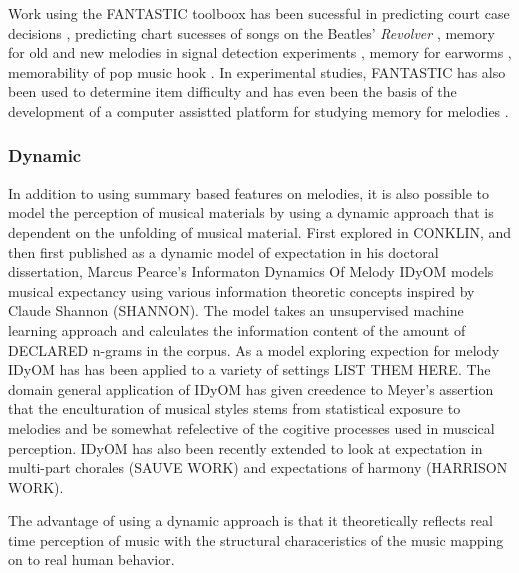 \documentclass[]{book}
\theoremstyle{definition}
\theoremstyle{definition}
\theoremstyle{definition}
\theoremstyle{remark}
\begin{document}
Work using the FANTASTIC toolboox has been sucessful in predicting court
case decisions \citep{mullensiefenCourtDecisionsMusic2009}, predicting
chart sucesses of songs on the Beatles' \emph{Revolver}
\citep{kopiezAufSucheNach2011}, memory for old and new melodies in
signal detection experiments
\citep{mullensiefenRoleFeaturesContext2014}, memory for earworms
\citep{jakubowskiDissectingEarwormMelodic2017, williamsonEarwormsThreeAngles2012},
memorability of pop music hook \citep{balenCorpusAnalyisTools2015}. In
experimental studies, FANTASTIC has also been used to determine item
difficulty
\citep{bakerPerceptionLeitmotivesRichard2017, harrisonModellingMelodicDiscrimination2016}
and has even been the basis of the development of a computer assistted
platform for studying memory for melodies
\citep{rainsfordMUSOSMUsicSOftware2018}.

\hypertarget{dynamic}{%
\subsubsection{Dynamic}\label{dynamic}}

In addition to using summary based features on melodies, it is also
possible to model the perception of musical materials by using a dynamic
approach that is dependent on the unfolding of musical material. First
explored in CONKLIN, and then first published as a dynamic model of
expectation in his doctoral dissertation, Marcus Pearce's Informaton
Dynamics Of Melody IDyOM models musical expectancy using various
information theoretic concepts inspired by Claude Shannon (SHANNON). The
model takes an unsupervised machine learning approach and calculates the
information content of the amount of DECLARED n-grams in the corpus. As
a model exploring expection for melody IDyOM has has been applied to a
variety of settings LIST THEM HERE. The domain general application of
IDyOM has given creedence to Meyer's assertion that the enculturation of
musical styles stems from statistical exposure to melodies and be
somewhat refelective of the cogitive processes used in muscical
perception. IDyOM has also been recently extended to look at expectation
in multi-part chorales (SAUVE WORK) and expectations of harmony
(HARRISON WORK).

\citep{pearceAuditoryExpectationInformation2012a, pearceStatisticalLearningProbabilistic2018}

The advantage of using a dynamic approach is that it theoretically
reflects real time perception of music with the structural
characeristics of the music mapping on to real human behavior.
\end{document}
